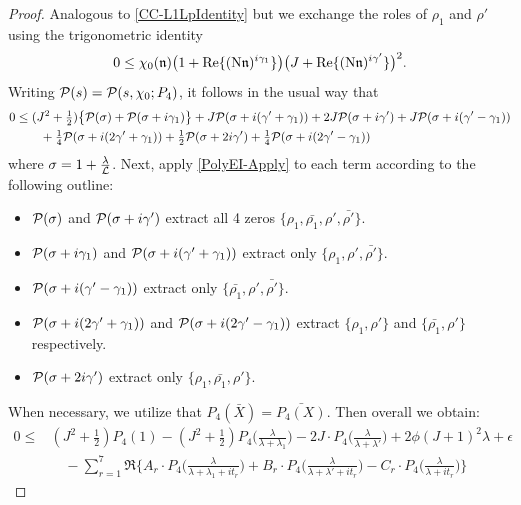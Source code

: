 \documentclass[12pt,psamsfonts]{amsart}
\theoremstyle{definition}
\theoremstyle{remark}
\numberwithin{equation}{section}
\begin{document}
\begin{proof} Analogous to \cref{CC-L1LpIdentity} but we exchange the roles of $\rho_1$ and $\rho'$ using the trigonometric identity
\[
0 \leq  \chi_0(\mathfrak{n}) \big(1 + \mathrm{Re}\{ (\mathrm{N}\mathfrak{n})^{i\gamma_1} \} \big) \big( J+ \mathrm{Re}\{ (\mathrm{N}\mathfrak{n})^{i\gamma'} \} \big)^2.
\]
Writing  $\mathcal{P}(s) = \mathcal{P}(s, \chi_0 ; P_4)$, it follows in the usual way that
\begin{equation}
\begin{aligned}
0 & \leq(J^2+\tfrac{1}{2}) \big\{ \mathcal{P}(\sigma)  + \mathcal{P}(\sigma+i\gamma_1) \big\}  + J \mathcal{P}(\sigma + i(\gamma'+\gamma_1)) + 2J \mathcal{P}(\sigma+i\gamma') + J \mathcal{P}(\sigma+i(\gamma'-\gamma_1)) \\
& \qquad + \tfrac{1}{4} \mathcal{P}(\sigma + i(2\gamma'+\gamma_1)) + \tfrac{1}{2} \mathcal{P}(\sigma+2i\gamma') + \tfrac{1}{4} \mathcal{P}(\sigma+i(2\gamma'-\gamma_1)) \\
\end{aligned} 
\label{TrigIdentity-CC-L1Lp_Principal}
\end{equation}
where $\sigma = 1 + \tfrac{\lambda}{\mathcal{L}}$. Next, apply \cref{PolyEI-Apply} to each term according to the following outline:
\begin{itemize}
	\item $\mathcal{P}(\sigma)$ and $\mathcal{P}(\sigma+i\gamma')$ extract all 4 zeros $\{\rho_1, \bar{\rho_1}, \rho', \bar{\rho'} \}$.
	\item $\mathcal{P}(\sigma+i\gamma_1)$ and $\mathcal{P}(\sigma + i(\gamma' + \gamma_1)) $ extract only $\{\rho_1, \rho', \bar{\rho'} \}$.
	\item $\mathcal{P}(\sigma + i(\gamma' - \gamma_1))$ extract only $\{ \bar{\rho_1}, \rho', \bar{\rho'} \}$.
	\item $ \mathcal{P}(\sigma + i(2\gamma'+\gamma_1))$ and $\mathcal{P}(\sigma + i(2\gamma'-\gamma_1))$  extract $\{\rho_1, \rho'\}$ and $\{\bar{\rho_1}, \rho'\}$ respectively.
	\item $\mathcal{P}(\sigma + 2i\gamma')$  extract only $\{ \rho_1, \bar{\rho_1}, \rho'\}$. 
\end{itemize}
When necessary, we utilize that $P_4(\bar{X}) = \bar{P_4(X)}$. Then overall we obtain:
\begin{equation}
\begin{aligned}
0 \leq & (J^2 + \tfrac{1}{2})  P_4(1) -  (J^2+\tfrac{1}{2}) P_4\big( \frac{\lambda}{\lambda+\lambda_1} \big) - 2J \cdot P_4\big( \frac{\lambda}{\lambda+\lambda'}\big) + 2\phi (J+1)^2 \lambda + \epsilon \\
& \quad - \sum_{r=1}^{7} \Re\Big\{  A_r \cdot P_4\big( \frac{\lambda}{\lambda+\lambda_1+it_r} \big) + B_r \cdot P_4\big( \frac{\lambda}{\lambda+\lambda' + it_r}\big) - C_r \cdot P_4\big( \frac{\lambda}{\lambda+it_r}\big)\Big\} 

\end{aligned}
\end{equation}
\end{proof}
\end{document}
